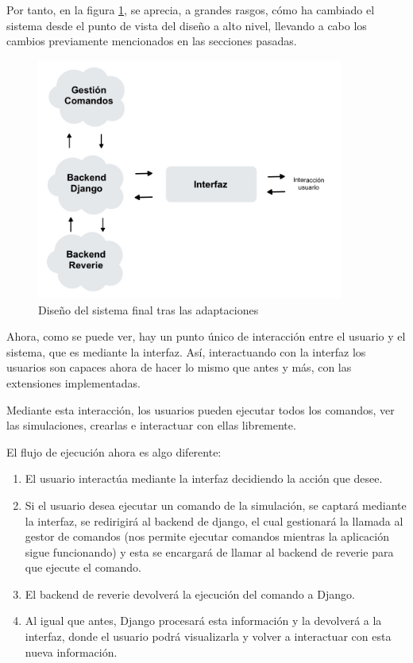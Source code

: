 Por tanto, en la figura \ref{fig:sistemaFinal}, se aprecia, a grandes rasgos, cómo ha cambiado el sistema desde el punto de vista del diseño a alto nivel, llevando a cabo los cambios previamente mencionados en las secciones pasadas.

\begin{figure}[h]
	\centering
	\includegraphics[width = 0.9\textwidth]{Imagenes/Vectorial/disenoSistemaFinal.jpeg}
	\caption{Diseño del sistema final tras las adaptaciones}
	\label{fig:sistemaFinal}
\end{figure}

Ahora, como se puede ver, hay un punto único de interacción entre el usuario y el sistema, que es mediante la interfaz. Así, interactuando con la interfaz los usuarios son capaces ahora de hacer lo mismo que antes y más, con las extensiones implementadas.

Mediante esta interacción, los usuarios pueden ejecutar todos los comandos, ver las simulaciones, crearlas e interactuar con ellas libremente.

El flujo de ejecución ahora es algo diferente:

\begin{enumerate}
	\item El usuario interactúa mediante la interfaz decidiendo la acción que desee.
	
	\item Si el usuario desea ejecutar un comando de la simulación, se captará mediante la interfaz, se redirigirá al backend de django, el cual gestionará la llamada al gestor de comandos (nos permite ejecutar comandos mientras la aplicación sigue funcionando) y esta se encargará de llamar al backend de reverie para que ejecute el comando.
	
	\item El backend de reverie devolverá la ejecución del comando a Django.
	
	\item Al igual que antes, Django procesará esta información y la devolverá a la interfaz, donde el usuario podrá visualizarla y volver a interactuar con esta nueva información.
	
\end{enumerate}
